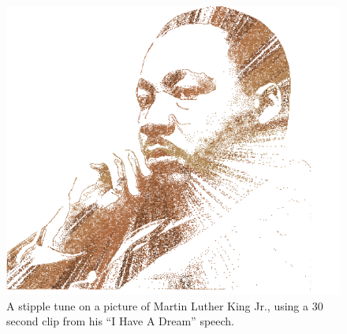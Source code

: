 \documentclass{article}
\begin{document}
\begin{figure}
  \centering
  \includegraphics[width=0.8\columnwidth]{mlkViterbiStipple.png}
  \caption{A stipple tune on a picture of Martin Luther King Jr., using a 30 second clip from his ``I Have A Dream'' speech.}
  \label{fig:mlkViterbiStipple}
\end{figure}
\end{document}
